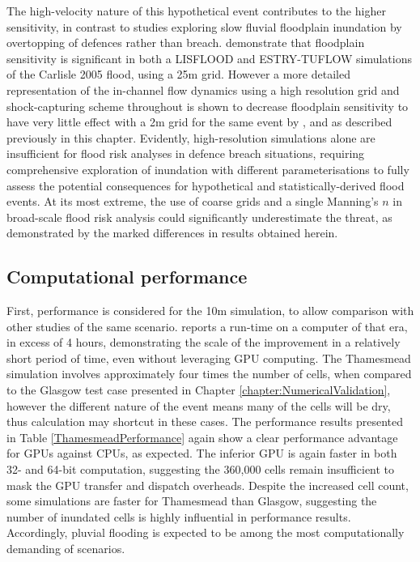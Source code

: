 The high-velocity nature of this hypothetical event contributes to the higher sensitivity, in contrast to studies exploring slow fluvial floodplain inundation by overtopping of defences rather than breach. \citet{Fewtrell2011a} demonstrate that floodplain sensitivity is significant in both a LISFLOOD and ESTRY-TUFLOW simulations of the Carlisle 2005 flood, using a 25m grid. However a more detailed representation of the in-channel flow dynamics using a high resolution grid and shock-capturing scheme throughout is shown to decrease floodplain sensitivity to have very little effect with a 2m grid for the same event by \citet{Smith2015}, and as described previously in this chapter.  Evidently, high-resolution simulations alone are insufficient for flood risk analyses in defence breach situations, requiring comprehensive exploration of inundation with different parameterisations to fully assess the potential consequences for hypothetical and statistically-derived flood events. At its most extreme, the use of coarse grids and a single Manning's $n$ in broad-scale flood risk analysis could significantly underestimate the threat, as demonstrated by the marked differences in results obtained herein.

\subsection{Computational performance}

First, performance is considered for the 10m simulation, to allow comparison with other studies of the same scenario. \citet{Liang2008a} reports a run-time on a computer of that era, in excess of 4 hours, demonstrating the scale of the improvement in a relatively short period of time, even without leveraging GPU computing. The Thamesmead simulation involves approximately four times the number of cells, when compared to the Glasgow test case presented in Chapter \ref{chapter:NumericalValidation}, however the different nature of the event means many of the cells will be dry, thus calculation may shortcut in these cases. The performance results presented in Table \ref{ThamesmeadPerformance} again show a clear performance advantage for GPUs against CPUs, as expected. The inferior GPU is again faster in both 32- and 64-bit computation, suggesting the 360,000 cells remain insufficient to mask the GPU transfer and dispatch overheads. Despite the increased cell count, some simulations are faster for Thamesmead than Glasgow, suggesting the number of inundated cells is highly influential in performance results. Accordingly, pluvial flooding is expected to be among the most computationally demanding of scenarios.

